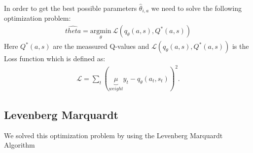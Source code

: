 In order to get the best possible parameters $\hat{\theta}_{i, a}$ we need to solve the following optimization problem:
\begin{align}
    \hat{theta} = \underset{\theta}{\text{argmin}} \ \mathcal{L}(q_\theta (a,s), Q^\ast (a,s))
\end{align}
Here $Q^\ast (a,s) $ are the meassured Q-values and $\mathcal{L}(q_\theta (a,s), Q^\ast (a,s))$ is the Loss function which is defined as:
\begin{align}
    \mathcal{L} = \sum_t ( \underbrace{\mu}_{weight} y_t - q_\theta (a_t , s_t) )^2. 
\end{align}

\subsection{Levenberg Marquardt}

We solved this optimization problem by using the Levenberg Marquardt Algorithm











